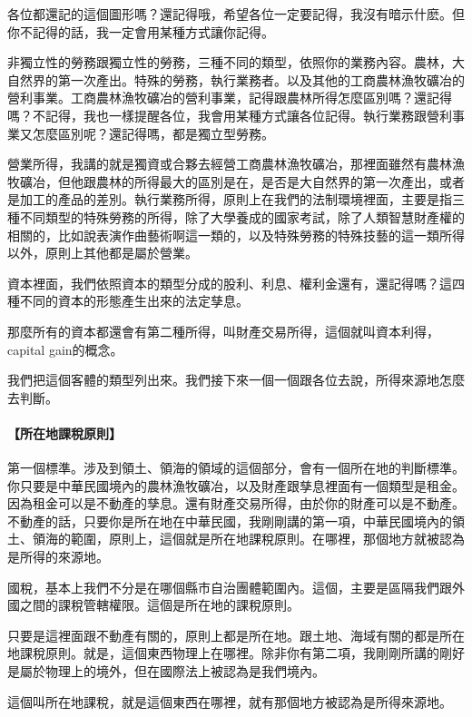 \documentclass[oneside,sub3section]{ctexbook}
\let\oldparagraph\paragraph
\renewcommand{\paragraph}[1]{\oldparagraph{#1}\mbox{}}
\begin{document}
各位都還記的這個圖形嗎？還記得哦，希望各位一定要記得，我沒有暗示什麽。但你不記得的話，我一定會用某種方式讓你記得。

非獨立性的勞務跟獨立性的勞務，三種不同的類型，依照你的業務內容。農林，大自然界的第一次產出。特殊的勞務，執行業務者。以及其他的工商農林漁牧礦冶的營利事業。工商農林漁牧礦冶的營利事業，記得跟農林所得怎麼區別嗎？還記得嗎？不記得，我也一樣提醒各位，我會用某種方式讓各位記得。執行業務跟營利事業又怎麼區別呢？還記得嗎，都是獨立型勞務。

營業所得，我講的就是獨資或合夥去經營工商農林漁牧礦冶，那裡面雖然有農林漁牧礦冶，但他跟農林的所得最大的區別是在，是否是大自然界的第一次產出，或者是加工的產品的差別。執行業務所得，原則上在我們的法制環境裡面，主要是指三種不同類型的特殊勞務的所得，除了大學養成的國家考試，除了人類智慧財產權的相關的，比如說表演作曲藝術啊這一類的，以及特殊勞務的特殊技藝的這一類所得以外，原則上其他都是屬於營業。

資本裡面，我們依照資本的類型分成的股利、利息、權利金還有，還記得嗎？這四種不同的資本的形態產生出來的法定孳息。

那麼所有的資本都還會有第二種所得，叫財產交易所得，這個就叫資本利得，capital gain的概念。

我們把這個客體的類型列出來。我們接下來一個一個跟各位去說，所得來源地怎麼去判斷。

\hypertarget{ux6240ux5728ux5730ux8ab2ux7a05ux539fux5247}{%
\paragraph{【所在地課稅原則】}\label{ux6240ux5728ux5730ux8ab2ux7a05ux539fux5247}}

第一個標準。涉及到領土、領海的領域的這個部分，會有一個所在地的判斷標準。你只要是中華民國境內的農林漁牧礦冶，以及財產跟孳息裡面有一個類型是租金。因為租金可以是不動產的孳息。還有財產交易所得，由於你的財產可以是不動產。不動產的話，只要你是所在地在中華民國，我剛剛講的第一項，中華民國境內的領土、領海的範圍，原則上，這個就是所在地課稅原則。在哪裡，那個地方就被認為是所得的來源地。

國稅，基本上我們不分是在哪個縣市自治團體範圍內。這個，主要是區隔我們跟外國之間的課稅管轄權限。這個是所在地的課稅原則。

只要是這裡面跟不動產有關的，原則上都是所在地。跟土地、海域有關的都是所在地課稅原則。就是，這個東西物理上在哪裡。除非你有第二項，我剛剛所講的剛好是屬於物理上的境外，但在國際法上被認為是我們境內。

這個叫所在地課稅，就是這個東西在哪裡，就有那個地方被認為是所得來源地。
\end{document}
